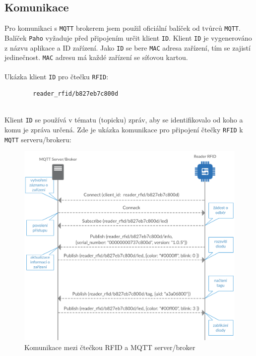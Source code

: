 \documentclass[czech,BP]{thesiskiv}
\begin{document}
	\subsection{Komunikace}
	Pro komunikaci s \texttt{MQTT} brokerem jsem použil oficiální balíček od tvůrců \texttt{MQTT}.
	Balíček \texttt{Paho} vyžaduje před připojením určit klient \texttt{ID}.
	Klient \texttt{ID} je vygenerováno z názvu aplikace a ID zařízení. 
	Jako \texttt{ID} se bere \texttt{MAC} adresa zařízení, tím se zajistí jedinečnost. \texttt{MAC} adresu má každé zařízení se síťovou kartou.
	\\\\
	Ukázka klient \texttt{ID} pro čtečku \texttt{RFID}:
	\begin{verbatim}
		reader_rfid/b827eb7c800d
	\end{verbatim}		
	\ \\
	Klient \texttt{ID} se používá v tématu (topicku) zpráv, aby se identifikovalo od koho a komu je zpráva určená.		
	Zde je ukázka komunikace pro připojení čtečky \texttt{RFID} k \texttt{MQTT} serveru/brokeru:	
	\begin{figure}[H]
		\centering
		\includegraphics[width=\textwidth]{../diagrams/mqtt_communication.png}	
		\caption{Komunikace mezi čtečkou RFID a MQTT server/broker}
		\label{fig:mqtt_communication}
	\end{figure}
\end{document}

